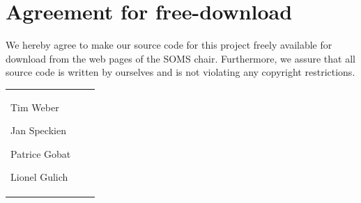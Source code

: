\documentclass[11pt]{article}
\begin{document}

\newpage


\newpage
\section*{Agreement for free-download}
\bigskip


\bigskip


\large We hereby agree to make our source code for this project freely available for download from the web pages of the SOMS chair. Furthermore, we assure that all source code is written by ourselves and is not violating any copyright restrictions.

\begin{center}

\bigskip


\bigskip





\begin{tabular}{@{}p{3.3cm}@{}p{6cm}@{}@{}p{6cm}@{}}

\begin{minipage}{6cm}
\vspace{2mm} 
\large Tim Weber
\vspace{\baselineskip}
\end{minipage}


\begin{minipage}{6cm}
\vspace{2mm} 
\large Jan Speckien
\vspace{\baselineskip}
\end{minipage}

\begin{minipage}{6cm}
\vspace{2mm} 
\large Patrice Gobat
\vspace{\baselineskip}
\end{minipage}

\begin{minipage}{6cm}
\vspace{2mm} 
\large Lionel Gulich
\vspace{\baselineskip}
\end{minipage}


\end{tabular}


\end{center}
\newpage

\end{document}
